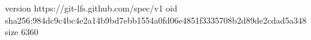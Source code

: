 version https://git-lfs.github.com/spec/v1
oid sha256:984dc9c4bc4e2a14b9bd7ebb1554a0fd06e4851f3335708b2d89de2cdad5a348
size 6360
